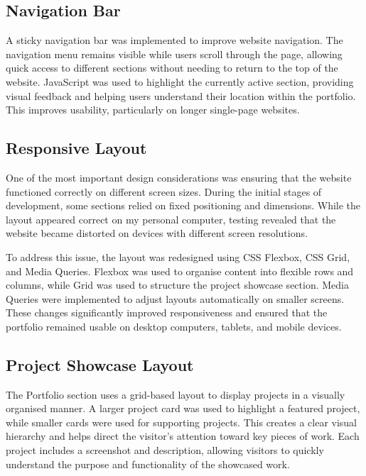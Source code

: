 \documentclass[12pt,a4paper]{article}
\begin{document}
\subsection{Navigation Bar}

A sticky navigation bar was implemented to improve website navigation. The 
navigation menu remains visible while users scroll through the page, 
allowing quick access to different sections without needing to return to 
the top of the website. JavaScript was used to highlight the currently 
active section, providing visual feedback and helping users understand 
their location within the portfolio. This improves usability, particularly 
on longer single-page websites.

\subsection{Responsive Layout}

One of the most important design considerations was ensuring that the 
website functioned correctly on different screen sizes. During the initial 
stages of development, some sections relied on fixed positioning and 
dimensions. While the layout appeared correct on my personal computer, 
testing revealed that the website became distorted on devices with 
different screen resolutions.

To address this issue, the layout was redesigned using CSS Flexbox, CSS 
Grid, and Media Queries. Flexbox was used to organise content into flexible 
rows and columns, while Grid was used to structure the project showcase 
section. Media Queries were implemented to adjust layouts automatically on 
smaller screens. These changes significantly improved responsiveness and 
ensured that the portfolio remained usable on desktop computers, tablets, 
and mobile devices.

\subsection{Project Showcase Layout}

The Portfolio section uses a grid-based layout to display projects in a 
visually organised manner. A larger project card was used to highlight a 
featured project, while smaller cards were used for supporting projects. 
This creates a clear visual hierarchy and helps direct the visitor's 
attention toward key pieces of work. Each project includes a screenshot and 
description, allowing visitors to quickly understand the purpose and 
functionality of the showcased work.
\end{document}

